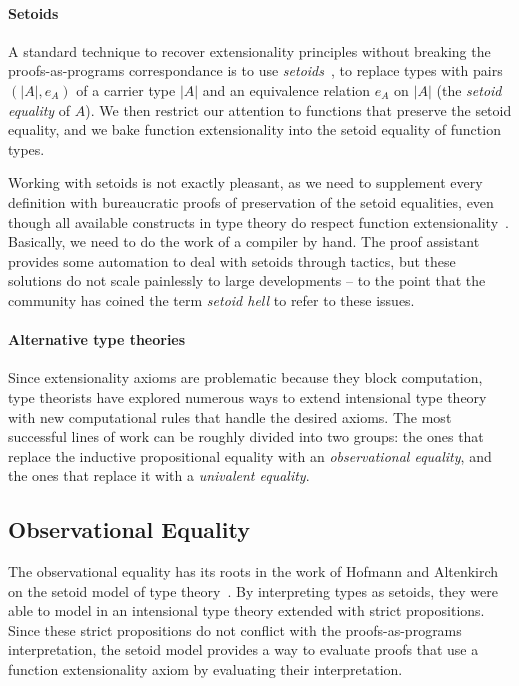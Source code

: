 \paragraph*{Setoids}
% 
A standard technique to recover extensionality principles without breaking the
proofs-as-programs correspondance is to use \emph{setoids}~,
\ie to replace types with pairs \( (|A|, e_A) \) of a carrier type \( |A| \)
and an equivalence relation \( e_A \) on \( |A| \) 
(the \emph{setoid equality} of \( A \)).
% 
We then restrict our attention to functions that preserve the setoid equality, 
and we bake function extensionality into the setoid equality of function types.

Working with setoids is not exactly pleasant, as we need to supplement every
definition with bureaucratic proofs of preservation of the setoid equalities,
even though all available constructs in type theory do respect function 
extensionality~.
% 
Basically, we need to do the work of a compiler by hand.
% 
The \Coq proof assistant provides some automation to deal with setoids through 
tactics, but these solutions do not scale painlessly to large developments -- 
to the point that the community has coined the term \emph{setoid hell} to refer 
to these issues.

\paragraph*{Alternative type theories}
% 
Since extensionality axioms are problematic because they block 
computation, type theorists have explored numerous ways to extend intensional
type theory with new computational rules that handle the desired axioms.
% 
The most successful lines of work can be roughly divided into two groups: the 
ones that replace the inductive propositional equality with an \emph{observational equality}, 
and the ones that replace it with a \emph{univalent equality}.
% 

\subsection{Observational Equality}

The observational equality has its roots in the work of Hofmann and 
Altenkirch on the setoid model of type theory~\cite{hofmann95,altenkirch99}.
% 
By interpreting types as setoids, they were able to model
in an intensional type theory extended with strict propositions.
% 
Since these strict propositions do not conflict with the proofs-as-programs 
interpretation, the setoid model provides a way to evaluate proofs that use a 
function extensionality axiom by evaluating their interpretation.

